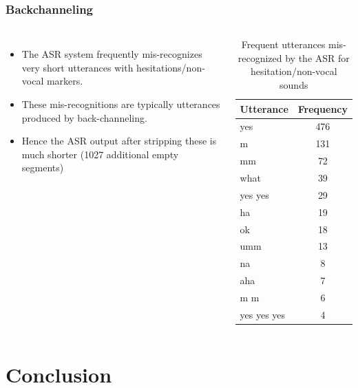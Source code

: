\documentclass{beamer}
\begin{document}
\begin{frame}
\frametitle{Backchanneling}
\begin{columns}[c] %

\vspace{-10mm}
\begin{itemize}
\item The ASR system frequently mis-recognizes very short utterances with hesitations/non-vocal markers.
\item These mis-recognitions are typically utterances produced by back-channeling.
\item Hence the ASR output after stripping these is much shorter (1027 additional empty segments)
\end{itemize}
\begin{table}
\begin{center}
\begin{tabular}{| l | c |}
\hline
\textbf{Utterance} & \textbf{Frequency}\\ \hline
yes & 476\\
m & 131\\
mm & 72\\
what & 39\\
yes yes & 29\\
ha & 19\\
ok & 18\\
umm & 13\\
na & 8\\
aha & 7\\
m m & 6\\
yes yes yes & 4\\
\hline
\end{tabular}
\caption{Frequent utterances mis-recognized by the ASR for hesitation/non-vocal sounds}
\end{center}
\end{table} 
\end{columns}
\end{frame}

\section{Conclusion} %
\end{document}
